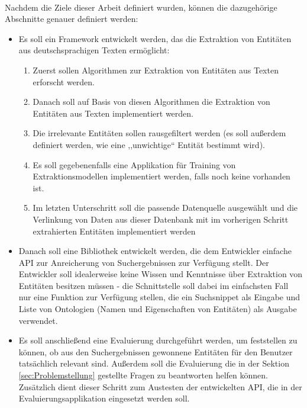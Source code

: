 \paragraph{}
Nachdem die Ziele dieser Arbeit definiert wurden, können die dazugehörige Abschnitte genauer definiert werden: 
\begin{itemize}
\item Es soll ein Framework entwickelt werden, das die Extraktion von Entitäten aus deutschsprachigen Texten ermöglicht:
\begin{enumerate}
\item Zuerst sollen Algorithmen zur Extraktion von Entitäten aus Texten erforscht werden.
\item Danach soll auf Basis von diesen Algorithmen die Extraktion von Entitäten aus Texten implementiert werden.
\item Die irrelevante Entitäten sollen rausgefiltert werden (es soll außerdem definiert werden, wie eine ,,unwichtige`` Entität bestimmt wird).
\item Es soll gegebenenfalls eine Applikation für Training von Extraktionsmodellen implementiert werden, falls noch keine vorhanden ist.
\item Im letzten Unterschritt soll die passende Datenquelle ausgewählt und die Verlinkung von Daten aus dieser Datenbank mit im vorherigen Schritt extrahierten Entitäten implementiert werden 
\end{enumerate}

\item Danach soll eine Bibliothek entwickelt werden, die dem Entwickler einfache API zur Anreicherung von Suchergebnissen zur Verfügung stellt. Der Entwickler soll idealerweise keine Wissen und Kenntnisse über Extraktion von Entitäten besitzen müssen - die Schnittstelle soll dabei im einfachsten Fall nur eine Funktion zur Verfügung stellen, die ein Suchsnippet als Eingabe und Liste von Ontologien (Namen und Eigenschaften von Entitäten) als Ausgabe verwendet.

\item Es soll anschließend eine Evaluierung durchgeführt werden, um feststellen zu können, ob aus den Suchergebnissen gewonnene Entitäten für den Benutzer tatsächlich relevant sind. Außerdem soll die Evaluierung die in der Sektion \ref{sec:Problemstellung} gestellte Fragen zu beantworten helfen können. Zusätzlich dient dieser Schritt zum Austesten der entwickelten API, die in der Evaluierungsapplikation eingesetzt werden soll.
\end{itemize}
